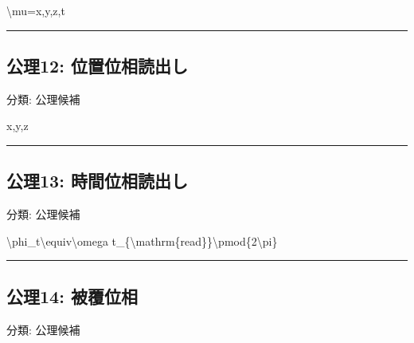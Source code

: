 \documentclass[
  a4paper,
]{ltjsarticle}
\newenvironment{Shaded}{}{}
\newcommand{\NormalTok}[1]{#1}
\begin{document}
\begin{Shaded}
\begin{Highlighting}[]
\NormalTok{\textbackslash{}mu=x,y,z,t}
\end{Highlighting}
\end{Shaded}

\begin{center}\rule{0.5\linewidth}{0.5pt}\end{center}

\subsection{公理12:
位置位相読出し}\label{ux516cux740612-ux4f4dux7f6eux4f4dux76f8ux8aadux51faux3057}

分類: 公理候補

\begin{Shaded}
\begin{Highlighting}[]
\NormalTok{x,y,z}
\end{Highlighting}
\end{Shaded}

\begin{center}\rule{0.5\linewidth}{0.5pt}\end{center}

\subsection{公理13:
時間位相読出し}\label{ux516cux740613-ux6642ux9593ux4f4dux76f8ux8aadux51faux3057}

分類: 公理候補

\begin{Shaded}
\begin{Highlighting}[]
\NormalTok{\textbackslash{}phi\_t\textbackslash{}equiv\textbackslash{}omega t\_\{\textbackslash{}mathrm\{read\}\}\textbackslash{}pmod\{2\textbackslash{}pi\}}
\end{Highlighting}
\end{Shaded}

\begin{center}\rule{0.5\linewidth}{0.5pt}\end{center}

\subsection{公理14:
被覆位相}\label{ux516cux740614-ux88abux8986ux4f4dux76f8}

分類: 公理候補
\end{document}
